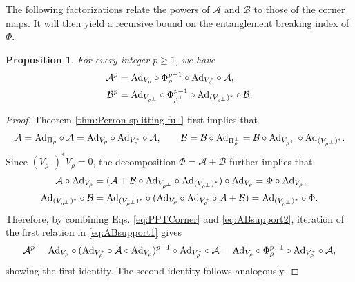\documentclass[11pt,reqno]{amsart}
\newtheorem{proposition}[theorem]{Proposition}
\theoremstyle{definition}
\theoremstyle{definition}
\theoremstyle{definition}
\theoremstyle{definition}
\newcommand{\A}{\mathcal{A}}
\newcommand{\B}{\mathcal{B}}
\newcommand{\Ad}{{\rm Ad}}
\begin{document}
The following factorizations relate the powers of $\A$ and $\B$ to those of the corner maps. It will then yield a recursive bound on the entanglement breaking index of $\Phi$.

\begin{proposition}
\label{prop:corner-factorization}
For every integer $p\geq 1$, we have
\begin{align*}
    \A^p &=\Ad_{V_{\rho}}\circ\Phi_{\rho}^{p-1}\circ \Ad_{V_{\rho}^*}\circ \A,\\
    \B^p &=\Ad_{V_{\rho^{\perp}}}\circ\Phi_{\rho^{\perp}}^{p-1}\circ\Ad_{(V_{\rho^{\perp}})^*} \circ \B.
\end{align*}
\end{proposition}

\begin{proof}
Theorem \ref{thm:Perron-splitting-full} first implies that
\begin{equation} \label{eq:ABsupport1}
    \A = \Ad_{\Pi_{\rho}}\circ \A = \Ad_{V_{\rho}}\circ \Ad_{V_{\rho}^*}\circ \A, \qquad \B = \B\circ \Ad_{\Pi_{\rho}^{\perp}} = \B \circ \Ad_{V_{\rho^{\perp}}}\circ \Ad_{(V_{\rho^{\perp}})^*}.
\end{equation}
Since $(V_{\rho^{\perp}})^*V_{\rho}=0$, the decomposition $\Phi=\A+\B$ further implies that
\begin{equation} \label{eq:ABsupport2}
\begin{split}
    \A\circ \Ad_{V_{\rho}} &= (\A+ \B \circ \Ad_{V_{\rho^{\perp}}}\circ \Ad_{(V_{\rho^{\perp}})^*}) \circ \Ad_{V_{\rho}} = \Phi \circ \Ad_{V_{\rho}},\\
    \Ad_{(V_{\rho^{\perp}})^*} \circ \B &= \Ad_{(V_{\rho^{\perp}})^*} \circ (\Ad_{V_{\rho}}\circ \Ad_{V_{\rho}^*}\circ \A + \B) = \Ad_{(V_{\rho^{\perp}})^*} \circ \Phi.
\end{split}
\end{equation}
Therefore, by combining Eqs. \eqref{eq:PPTCorner} and \eqref{eq:ABsupport2}, iteration of the first relation in \eqref{eq:ABsupport1} gives
    $$\A^p = \Ad_{V_{\rho}} \circ (\Ad_{V_{\rho}^*}\circ \A \circ \Ad_{V_{\rho}})^{p-1}\circ \Ad_{V_{\rho}^*} \circ\A = \Ad_{V_{\rho}} \circ \Phi_{\rho}^{p-1}\circ \Ad_{V_{\rho}^*} \circ\A,$$
showing the first identity. The second identity follows analogously.
\end{proof}
\end{document}
